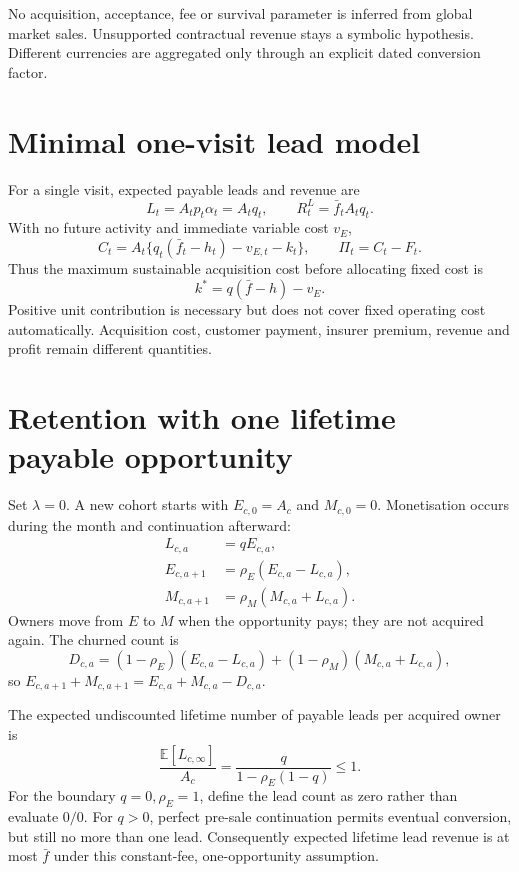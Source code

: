 \documentclass[11pt,a4paper]{article}
\newcommand{\E}{\mathbb E}
\begin{document}
No acquisition, acceptance, fee or survival parameter is inferred from global market sales. Unsupported contractual revenue stays a symbolic hypothesis. Different currencies are aggregated only through an explicit dated conversion factor.

\section{Minimal one-visit lead model}

For a single visit, expected payable leads and revenue are
\begin{equation}
 L_t=A_t p_t\alpha_t=A_tq_t,
 \qquad R_t^{L}=\bar f_t A_tq_t.
 \label{eq:minimal}
\end{equation}
With no future activity and immediate variable cost $v_E$,
\begin{equation}
 C_t=A_t\{q_t(\bar f_t-h_t)-v_{E,t}-k_t\},
 \qquad \Pi_t=C_t-F_t.
 \label{eq:singleprofit}
\end{equation}
Thus the maximum sustainable acquisition cost before allocating fixed cost is
\begin{equation}
 k^{*}=q(\bar f-h)-v_E.
 \label{eq:cac}
\end{equation}
Positive unit contribution is necessary but does not cover fixed operating cost automatically. Acquisition cost, customer payment, insurer premium, revenue and profit remain different quantities.

\section{Retention with one lifetime payable opportunity}

Set $\lambda=0$. A new cohort starts with $E_{c,0}=A_c$ and $M_{c,0}=0$. Monetisation occurs during the month and continuation afterward:
\begin{align}
 L_{c,a}&=qE_{c,a},\\
 E_{c,a+1}&=\rho_E(E_{c,a}-L_{c,a}),\\
 M_{c,a+1}&=\rho_M(M_{c,a}+L_{c,a}).
 \label{eq:states}
\end{align}
Owners move from $E$ to $M$ when the opportunity pays; they are not acquired again. The churned count is
\begin{equation}
 D_{c,a}=(1-\rho_E)(E_{c,a}-L_{c,a})
       +(1-\rho_M)(M_{c,a}+L_{c,a}),
\end{equation}
so $E_{c,a+1}+M_{c,a+1}=E_{c,a}+M_{c,a}-D_{c,a}$.

The expected undiscounted lifetime number of payable leads per acquired owner is
\begin{equation}
 \frac{\E[L_{c,\infty}]}{A_c}
 =\frac{q}{1-\rho_E(1-q)}\leq1.
 \label{eq:leadceiling}
\end{equation}
For the boundary $q=0,\rho_E=1$, define the lead count as zero rather than evaluate $0/0$. For $q>0$, perfect pre-sale continuation permits eventual conversion, but still no more than one lead. Consequently expected lifetime lead revenue is at most $\bar f$ under this constant-fee, one-opportunity assumption.
\end{document}
